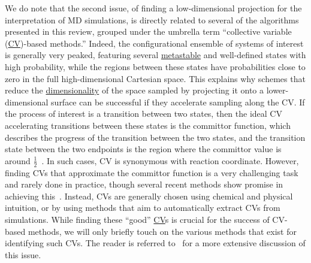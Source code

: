 \documentclass[9pt,review]{livecoms}
\begin{document}
We do note that the second issue, of finding a low-dimensional projection for the interpretation of MD simulations, is directly related to several of the algorithms presented in this review, grouped under the umbrella term ``collective variable (\hyperlink{ref:CV} {CV})-based methods.'' Indeed, the configurational ensemble of systems of interest is generally very peaked, featuring several \hyperlink{ref:metastab} {metastable} and well-defined states with high probability, while the regions between these states have probabilities close to zero in the full high-dimensional Cartesian space. This explains why schemes that reduce the \hyperlink{ref:DimRed} {dimensionality} of the space sampled by projecting it onto a lower-dimensional surface can be successful if they accelerate sampling along the CV.
If the process of interest is a transition between two states, then the ideal CV accelerating transitions between these states is the committor function, which describes the progress of the transition between the two states, and the transition state between the two endpoints is the region where the committor value is around $\frac{1}{2}$~\cite{doi:10.1146/annurev.physchem.53.082301.113146,LiMa_2014,BaronPeters_RC_ARPC_2015,BanushkinaKrivov_2016,Tuckerman2010}. In such cases, CV is synonymous with reaction coordinate. However, finding CVs that approximate the committor function is a very challenging task and rarely done in practice, though several recent methods show promise in achieving this~\cite{LiLinRen_2019,MoriMatubayasi_2020,PalacioRodriguez_Pietrucci_2022,JungHummer_2021,FrassekBolhuis_2021,WuMa_2022}. Instead, CVs are generally chosen using chemical and physical intuition, or by using methods that aim to automatically extract CVs from simulations. While finding these ``good'' \hyperlink{ref:CV} {CV}s is crucial for the success of CV-based methods, we will only briefly touch on the various methods that exist for identifying such CVs. The reader is referred to~\cite{WANG2020139, doi:10.1080/00268976.2020.1737742, doi:10.1021/acs.jctc.0c00355} for a more extensive discussion of this issue.
\end{document}
